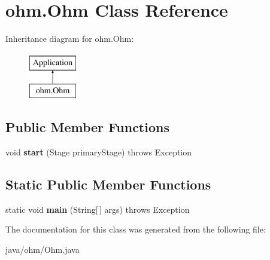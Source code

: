 \hypertarget{classohm_1_1_ohm}{}\section{ohm.\+Ohm Class Reference}
\label{classohm_1_1_ohm}
Inheritance diagram for ohm.\+Ohm\+:\begin{figure}[H]
\begin{center}
\leavevmode
\includegraphics[height=2.000000cm]{classohm_1_1_ohm}
\end{center}
\end{figure}
\subsection*{Public Member Functions}
\begin{DoxyCompactItemize}
\item 
\hypertarget{classohm_1_1_ohm_aa571bf3c8c1419af5e4b875293ac6123}{}\label{classohm_1_1_ohm_aa571bf3c8c1419af5e4b875293ac6123} 
void {\bfseries start} (Stage primary\+Stage)  throws Exception
\end{DoxyCompactItemize}
\subsection*{Static Public Member Functions}
\begin{DoxyCompactItemize}
\item 
\hypertarget{classohm_1_1_ohm_a0ac90b2134f0974b8dd2d657cdcf99a2}{}\label{classohm_1_1_ohm_a0ac90b2134f0974b8dd2d657cdcf99a2} 
static void {\bfseries main} (String\mbox{[}$\,$\mbox{]} args)  throws Exception
\end{DoxyCompactItemize}


The documentation for this class was generated from the following file\+:\begin{DoxyCompactItemize}
\item 
java/ohm/Ohm.\+java\end{DoxyCompactItemize}
